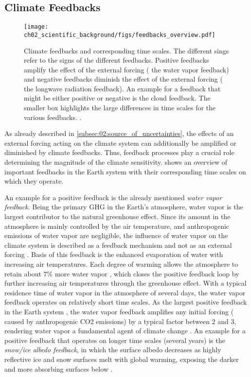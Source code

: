 \subsection{Climate Feedbacks}
\label{subsec:02:climate_feedbacks}

\begin{figure}[!t]
  \centering
  \texttt{[image: 
    ch02\_scientific\_background/figs/feedbacks\_overview.pdf]}
  \caption[
    Climate feedbacks and corresponding time scales.
  ]{
    Climate feedbacks and corresponding time scales. The different sings refer
    to the signs of the different feedbacks. Positive feedbacks amplify the
    effect of the external forcing (\eg{} the water vapor feedback) and
    negative feedbacks diminish the effect of the external forcing (\eg{} the
    longwave radiation feedback). An example for a feedback that might be
    either positive or negative is the cloud feedback. The smaller box
    highlights the large differences in time scales for the various feedbacks.
    .
  }
  \label{fig:02:feedbacks_overview}
\end{figure}

As already described in \cref{subsec:02:source_of_uncertainties}, the effects
of an external forcing acting on the climate system can additionally be
amplified or diminished by climate feedbacks. Thus, feedback processes play a
crucial role determining the magnitude of the climate sensitivity.
 shows an overview of important feedbacks in
the Earth system with their corresponding time scales on which they operate.

An example for a positive feedback is the already mentioned \emph{water vapor
  feedback}. Being the primary \ac{GHG} in the Earth's atmosphere, water vapor
is the largest contributor to the natural greenhouse effect. Since its amount
in the atmosphere is mainly controlled by the air temperature, and
anthropogenic emissions of water vapor are negligible, the influence of water
vapor on the climate system is described as a feedback mechanism and not as an
external forcing \autocite{Myhre2013}. Basis of this feedback is the enhanced
evaporation of water with increasing air temperatures. Each degree of warming
allows the atmosphere to retain about $7 \unit{\%}$ more water vapor
\autocite{Myhre2013}, which closes the positive feedback loop by further
increasing air temperatures through the greenhouse effect. With a typical
residence time of water vapor in the atmosphere of several days, the water
vapor feedback operates on relatively short time scales. As the largest
positive feedback in the Earth system \autocite{Soden2006}, the water vapor
feedback amplifies any initial forcing (\eg{} caused by anthropogenic \ac{CO2}
emissions) by a typical factor between $2$ and $3$, rendering water vapor a
fundamental agent of climate change \autocite{Myhre2013}. An example for a
positive feedback that operates on longer time scales (several years) is the
\emph{snow/ice albedo feedback}, in which the surface albedo decreases as
highly reflective ice and snow surfaces melt with global warming, exposing the
darker and more absorbing surfaces below \autocite{Cubasch2013}.

